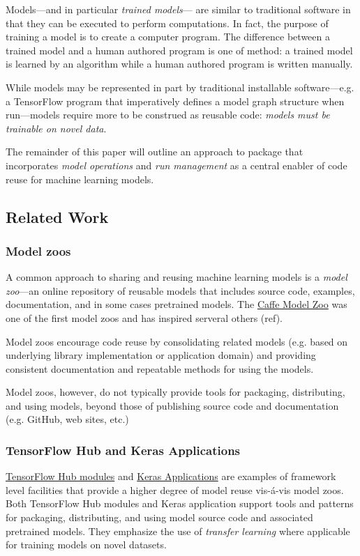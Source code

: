 \documentclass{article}
\begin{document}
Models---and in particular \emph{trained models}--- are similar to
traditional software in that they can be executed to perform
computations. In fact, the purpose of training a model is to create a
computer program. The difference between a trained model and a human
authored program is one of method: a trained model is learned by an
algorithm while a human authored program is written manually.

While models may be represented in part by traditional installable
software---e.g. a TensorFlow program that imperatively defines a model
graph structure when run---models require more to be construed as
reusable code: \emph{models must be trainable on novel data}.

The remainder of this paper will outline an approach to package that
incorporates \emph{model operations} and \emph{run management} as a
central enabler of code reuse for machine learning models.

\subsection{Related Work}

\subsubsection{Model zoos}

A common approach to sharing and reusing machine learning models is a
\emph{model zoo}---an online repository of reusable models that
includes source code, examples, documentation, and in some cases
pretrained models. The \href{Caffe Model Zoo}{Caffe Model Zoo} was one
of the first model zoos and has inspired serveral others (ref).

Model zoos encourage code reuse by consolidating related models
(e.g. based on underlying library implementation or application
domain) and providing consistent documentation and repeatable methods
for using the models.

Model zoos, however, do not typically provide tools for packaging,
distributing, and using models, beyond those of publishing source code
and documentation (e.g. GitHub, web sites, etc.)

\subsubsection{TensorFlow Hub and Keras Applications}

\href{https://www.tensorflow.org/hub/}{TensorFlow Hub modules} and
\href{https://keras.io/applications/}{Keras Applications} are examples
of framework level facilities that provide a higher degree of model
reuse vis-\'a-vis model zoos. Both TensorFlow Hub modules and Keras
application support tools and patterns for packaging, distributing,
and using model source code and associated pretrained models. They
emphasize the use of \emph{transfer learning} where applicable for
training models on novel datasets.
\end{document}
